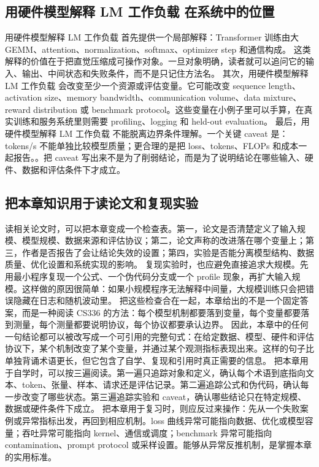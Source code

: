 \documentclass[a4paper]{article}
\begin{document}
\subsection{用硬件模型解释 LM 工作负载 在系统中的位置}
用硬件模型解释 LM 工作负载 首先提供一个局部解释：Transformer 训练由大 GEMM、attention、normalization、softmax、optimizer step 和通信构成。 这类解释的价值在于把直觉压缩成可操作对象。一旦对象明确，读者就可以追问它的输入、输出、中间状态和失败条件，而不是只记住方法名。
其次，用硬件模型解释 LM 工作负载 会改变至少一个资源或评估变量。它可能改变 sequence length、activation size、memory bandwidth、communication volume、data mixture、reward distribution 或 benchmark protocol。这些变量在小例子里可以手算，在真实训练和服务系统里则需要 profiling、logging 和 held-out evaluation。
最后，用硬件模型解释 LM 工作负载 不能脱离边界条件理解。一个关键 caveat 是：tokens/s 不能单独比较模型质量；更合理的是把 loss、tokens、FLOPs 和成本一起报告。。把 caveat 写出来不是为了削弱结论，而是为了说明结论在哪些输入、硬件、数据和评估条件下才成立。
\subsection{把本章知识用于读论文和复现实验}
读相关论文时，可以把本章变成一个检查表。第一，论文是否清楚定义了输入规模、模型规模、数据来源和评估协议；第二，论文声称的改进落在哪个变量上；第三，作者是否报告了会让结论失效的设置；第四，实验是否能分离模型结构、数据质量、优化设置和系统实现的影响。
复现实验时，也应避免直接追求大规模。先用最小程序复现一个公式、一个伪代码分支或一个 profile 现象，再扩大输入规模。这样做的原因很简单：如果小规模程序无法解释中间量，大规模训练只会把错误隐藏在日志和随机波动里。
把这些检查合在一起，本章给出的不是一个固定答案，而是一种阅读 CS336 的方法：每个模型机制都要落到变量，每个变量都要落到测量，每个测量都要说明协议，每个协议都要承认边界。
因此，本章中的任何一句结论都可以被改写成一个可引用的完整句式：在给定数据、模型、硬件和评估协议下，某个机制改变了某个变量，并通过某个观测指标表现出来。这样的句子比单独背诵术语更长，但它包含了自学、复现和引用时真正需要的信息。
把本章用于自学时，可以按三遍阅读。第一遍只追踪对象和定义，确认每个术语到底指向文本、token、张量、样本、请求还是评估记录。第二遍追踪公式和伪代码，确认每一步改变了哪些状态。第三遍追踪实验和 caveat，确认哪些结论只在特定规模、数据或硬件条件下成立。
把本章用于复习时，则应反过来操作：先从一个失败案例或异常指标出发，再回到相应机制。loss 曲线异常可能指向数据、优化或模型容量；吞吐异常可能指向 kernel、通信或调度；benchmark 异常可能指向 contamination、prompt protocol 或采样设置。能够从异常反推机制，是掌握本章的实用标准。
\end{document}
